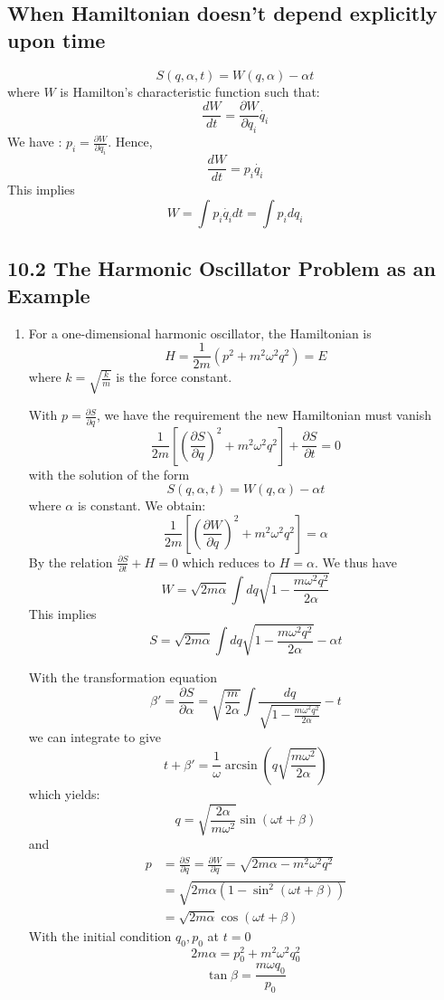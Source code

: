 \documentclass{article}
\begin{document}
	\subsection*{When Hamiltonian doesn't depend explicitly upon time}
	\[ S(q, \alpha, t) = W(q, \alpha) - \alpha t \]
	where $W$ is Hamilton's characteristic function such that:
	\[ \frac{dW}{dt} = \frac{\partial W}{\partial q_i} \dot{q_i} \]
	We have : $p_i = \frac{\partial W}{\partial q_i}$.
	Hence,
	\[ \frac{dW}{dt} = p_i \dot{q_i} \]
	This implies
	\[ W = \int p_i \dot{q_i} dt = \int p_i dq_i \]
	
	\subsection{10.2 The Harmonic Oscillator Problem as an Example}
	\begin{enumerate}
		\item For a one-dimensional harmonic oscillator, the Hamiltonian is
		\[ H = \frac{1}{2m}(p^2 + m^2 \omega^2 q^2) = E \]
		where $k = \sqrt{\frac{k}{m}}$ is the force constant.
		
		With $p = \frac{\partial S}{\partial q}$, we have the requirement the new Hamiltonian must vanish
		\[ \frac{1}{2m}\left[ \left(\frac{\partial S}{\partial q}\right)^2 + m^2 \omega^2 q^2 \right] + \frac{\partial S}{\partial t} = 0 \]
		with the solution of the form
		\[ S(q, \alpha, t) = W(q, \alpha) - \alpha t \]
		where $\alpha$ is constant. We obtain:
		\[ \frac{1}{2m}\left[ \left(\frac{\partial W}{\partial q}\right)^2 + m^2 \omega^2 q^2 \right] = \alpha \]
		By the relation $\frac{\partial S}{\partial t} + H = 0$ which reduces to $H = \alpha$.
		We thus have
		\[ W = \sqrt{2m\alpha} \int dq \sqrt{1 - \frac{m\omega^2 q^2}{2\alpha}} \]
		This implies
		\[ S = \sqrt{2m\alpha} \int dq \sqrt{1 - \frac{m\omega^2 q^2}{2\alpha}} - \alpha t \]
		
		With the transformation equation
		\[ \beta' = \frac{\partial S}{\partial \alpha} = \sqrt{\frac{m}{2\alpha}} \int \frac{dq}{\sqrt{1 - \frac{m\omega^2 q^2}{2\alpha}}} - t \]
		we can integrate to give
		\[ t + \beta' = \frac{1}{\omega} \arcsin(q\sqrt{\frac{m\omega^2}{2\alpha}}) \]
		which yields:
		\[ q = \sqrt{\frac{2\alpha}{m\omega^2}} \sin(\omega t + \beta) \]
		and
		\begin{align*}
			p &= \frac{\partial S}{\partial q} = \frac{\partial W}{\partial q} = \sqrt{2m\alpha - m^2\omega^2 q^2} \\
			&= \sqrt{2m\alpha(1 - \sin^2(\omega t + \beta))} \\
			&= \sqrt{2m\alpha} \cos(\omega t + \beta)
		\end{align*}
		With the initial condition $q_0, p_0$ at $t=0$
		\[ 2m\alpha = p_0^2 + m^2 \omega^2 q_0^2 \]
		\[ \tan \beta = \frac{m\omega q_0}{p_0} \]
		

\end{enumerate}
\end{document}
